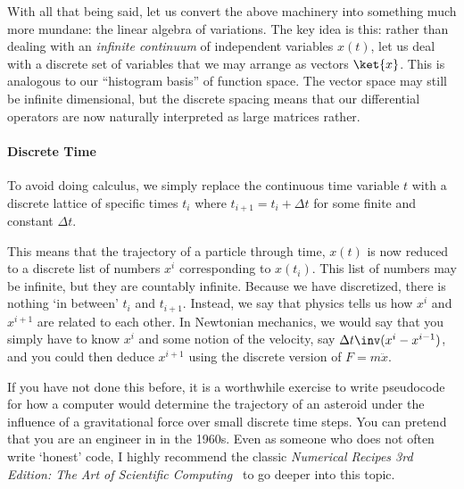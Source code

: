 With all that being said, let us convert the above machinery into something much more mundane: the linear algebra of variations. The key idea is this: rather than dealing with an \emph{infinite continuum} of independent variables $x(t)$, let us deal with a discrete set of variables that we may arrange as vectors $\ket{x}$. This is analogous to our ``histogram basis'' of function space. The vector space may still be infinite dimensional, but the discrete spacing means that our differential operators are now naturally interpreted as large matrices rather.




\paragraph{Discrete Time} To avoid doing calculus, we simply replace the continuous time variable $t$ with a discrete lattice of specific times $t_i$ where $t_{i+1} = t_i + \Delta t$ for some finite and constant $\Delta t$.

This means that the trajectory of a particle through time, $x(t)$ is now reduced to a discrete list of numbers $x^i$ corresponding to $x(t_i)$. This list of numbers may be infinite, but they are countably infinite. Because we have discretized, there is nothing `in between' $t_i$ and $t_{i+1}$. Instead, we say that physics tells us how $x^{i}$ and $x^{i+1}$ are related to each other. In Newtonian mechanics, we would say that you simply have to know $x^i$ and some notion of the velocity, say $\Delta t\inv(x^i-x^{i-1})$, and you could then deduce $x^{i+1}$ using the discrete version of $F=m\ddot{x}$.
\begin{exercise}
If you have not done this before, it is a worthwhile exercise to write pseudocode for how a computer would determine the trajectory of an asteroid under the influence of a gravitational force over small discrete time steps. You can pretend that you are an engineer in  in the 1960s. Even as someone who does not often write `honest' code, I highly recommend the classic \emph{Numerical Recipes 3rd Edition: The Art of Scientific Computing}~\autocite{10.5555/1403886} to go deeper into this topic.
\end{exercise}

